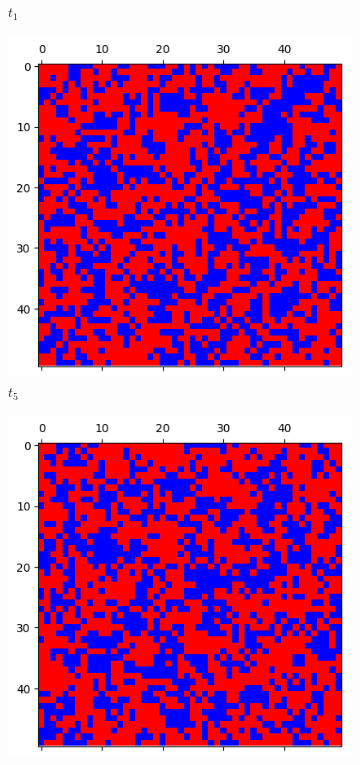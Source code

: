 \documentclass[letterpaper]{article}
\begin{document}
\begin{figure}
\begin{subfigure}{.33\textwidth}
      \caption{$t_1$}
      \label{fig:t1_50part2}
    \end{subfigure}
    \begin{subfigure}{.33\textwidth}
      \centering
      \includegraphics[width=1\linewidth]{images/assign2/visu_50-part2/t5}
      \caption{$t_5$}
      \label{fig:t5_50part2}
    \end{subfigure}
    \begin{subfigure}{.33\textwidth}
      \centering
      \includegraphics[width=1\linewidth]{images/assign2/visu_50-part2/t10}

\end{subfigure}
\end{figure}
\end{document}
